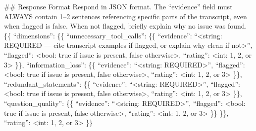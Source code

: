 \begin{tcolorbox}[promptbox, title={\small Conversation Progression Prompt}]
      \#\# Response Format\newline
      Respond in JSON format. The ``evidence'' field must ALWAYS contain 1--2 sentences referencing specific parts of the transcript, even when flagged is false. When not flagged, briefly explain why no issue was found.\newline
      \{\{\newline
          ``dimensions'': \{\{\newline
              ``unnecessary\_tool\_calls'': \{\{\newline
                 ``evidence'': ``\textless{}string: REQUIRED --- cite transcript examples if flagged, or explain why clean if not\textgreater{}'',\newline
                 ``flagged'': \textless{}bool: true if issue is present, false otherwise\textgreater{},\newline
                 ``rating'': \textless{}int: 1, 2, or 3\textgreater{}\newline
              \}\},\newline
              ``information\_loss'': \{\{\newline
                  ``evidence'': ``\textless{}string: REQUIRED\textgreater{}'',\newline
                  ``flagged'': \textless{}bool: true if issue is present, false otherwise\textgreater{},\newline
                  ``rating'': \textless{}int: 1, 2, or 3\textgreater{}\newline
              \}\},\newline
              ``redundant\_statements'': \{\{\newline
                  ``evidence'': ``\textless{}string: REQUIRED\textgreater{}'',\newline
                  ``flagged'': \textless{}bool: true if issue is present, false otherwise\textgreater{},\newline
                  ``rating'': \textless{}int: 1, 2, or 3\textgreater{}\newline
              \}\},\newline
              ``question\_quality'': \{\{\newline
                  ``evidence'': ``\textless{}string: REQUIRED\textgreater{}'',\newline
                  ``flagged'': \textless{}bool: true if issue is present, false otherwise\textgreater{},\newline
                  ``rating'': \textless{}int: 1, 2, or 3\textgreater{}\newline
              \}\}\newline
          \}\},\newline
          ``rating'': \textless{}int: 1, 2, or 3\textgreater{}\newline
      \}\}
\end{tcolorbox}

